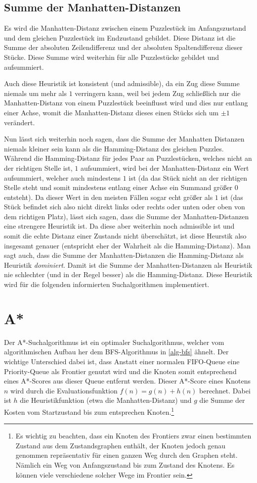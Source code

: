 \documentclass{whswinvcbook}
\begin{document}
\subsection{Summe der Manhatten-Distanzen}
Es wird die Manhatten-Distanz zwischen einem Puzzlestück im Anfangszustand und dem gleichen Puzzlestück im Endzustand gebildet. Diese Distanz ist die Summe der absoluten Zeilendifferenz und der absoluten Spaltendifferenz dieser Stücke. Diese Summe wird weiterhin für alle Puzzlestücke gebildet und aufsummiert.

Auch diese Heuristik ist konsistent (und admissible), da ein Zug diese Summe niemals um mehr als $1$ verringern kann, weil bei jedem Zug schließlich nur die Manhatten-Distanz von einem Puzzlestück beeinflusst wird und dies nur entlang einer Achse, womit die Manhatten-Distanz dieses einen Stücks sich um $\pm1$ verändert.

Nun lässt sich weiterhin noch sagen, dass die Summe der Manhatten Distanzen niemals kleiner sein kann als die Hamming-Distanz des gleichen Puzzles. Während die Hamming-Distanz für jedes Paar an Puzzlestücken, welches nicht an der richtigen Stelle ist, $1$ aufsummiert, wird bei der Manhatten-Distanz ein Wert aufsummiert, welcher auch mindestens $1$ ist (da das Stück nicht an der richtigen Stelle steht und somit mindestens entlang einer Achse ein Summand größer $0$ entsteht). Da dieser Wert in den meisten Fällen sogar echt größer als $1$ ist (das Stück befindet sich also nicht direkt links oder rechts oder unten oder oben von dem richtigen Platz), lässt sich sagen, dass die Summe der Manhatten-Distanzen eine strengere Heuristik ist. Da diese aber weiterhin noch admissible ist und somit die echte Distanz einer Zustands nicht überschätzt, ist diese Heurstik also insgesamt genauer (entspricht eher der Wahrheit als die Hamming-Distanz). Man sagt auch, dass die Summe der Manhatten-Distanzen die Hamming-Distanz als Heuristik \textit{dominiert}. Damit ist die Summe der Manhatten-Distanzen als Heuristik nie schlechter (und in der Regel besser) als die Hamming-Distanz. Diese Heuristik wird für die folgenden informierten Suchalgorithmen implementiert.
\section{A*}
Der A*-Suchalgorithmus ist ein optimaler Suchalgorithmus, welcher vom algorithmischen Aufbau her dem BFS-Algorithmus in \ref{alg-bfs} ähnelt. Der wichtige Unterschied dabei ist, dass Anstatt einer normalen FIFO-Queue eine Priority-Queue als Frontier genutzt wird und die Knoten somit entsprechend eines A*-Scores aus dieser Queue entfernt werden. Dieser A*-Score eines Knotens $n$ wird durch die Evaluationsfunktion $f(n)=g(n)+h(n)$ berechnet. Dabei ist $h$ die Heuristikfunktion (etwa die Manhatten-Distanz) und $g$ die Summe der Kosten vom Startzustand bis zum entsprechen Knoten.\footnote{Es wichtig zu beachten, dass ein Knoten des Frontiers zwar einen bestimmten Zustand aus dem Zustandsgraphen enthält, der Knoten jedoch genau genommen repräsentativ für einen ganzen Weg durch den Graphen steht. Nämlich ein Weg von Anfangszustand bis zum Zustand des Knotens. Es können viele verschiedene solcher Wege im Frontier sein.}
\end{document}
